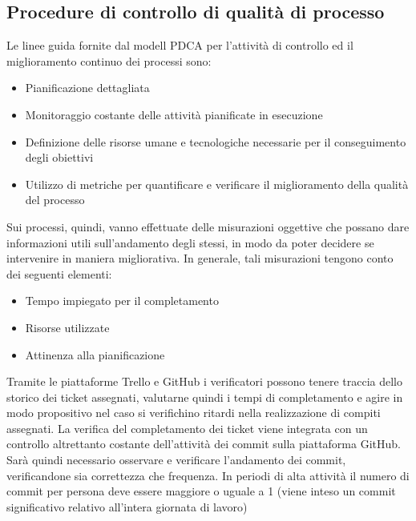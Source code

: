 \documentclass[a4paper,11pt]{article}
\begin{document}
\subsection{Procedure di controllo di qualità di processo}
Le linee guida fornite dal modell PDCA per l'attività di controllo ed il miglioramento continuo dei processi sono:
\begin{itemize}
\item Pianificazione dettagliata
\item Monitoraggio costante delle attività pianificate in esecuzione
\item Definizione delle risorse umane e tecnologiche necessarie per il conseguimento degli obiettivi
\item Utilizzo di metriche per quantificare e verificare il miglioramento della qualità del processo
\end{itemize}  
Sui processi, quindi, vanno effettuate delle misurazioni oggettive che possano dare informazioni utili sull'andamento degli stessi, in modo da poter decidere se intervenire in maniera migliorativa. 
In generale, tali misurazioni tengono conto dei seguenti elementi: 
\begin{itemize}
\item Tempo impiegato per il completamento
\item Risorse utilizzate 
\item Attinenza alla pianificazione
\end{itemize}
Tramite le piattaforme Trello e GitHub i verificatori possono tenere traccia dello storico dei ticket assegnati, valutarne quindi i tempi di completamento e agire in modo propositivo nel caso si verifichino ritardi nella realizzazione di compiti assegnati.
La verifica del completamento dei ticket viene integrata con un controllo altrettanto costante dell'attività dei commit sulla piattaforma GitHub. Sarà quindi necessario osservare e verificare l'andamento dei commit, verificandone sia correttezza che frequenza.
In periodi di alta attività il numero di commit per persona deve essere maggiore o uguale a 1 (viene inteso un commit significativo relativo all'intera giornata di lavoro) 
\end{document}
